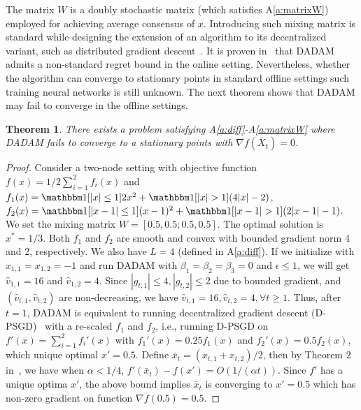 \documentclass[11pt]{article}
\newtheorem{theorem}{Theorem}
\begin{document}
The matrix $W$ is a doubly stochastic matrix (which satisfies A\ref{a:matrixW}) employed for achieving average consensus of $x$. 
Introducing such mixing matrix is standard while designing the extension of an algorithm to its decentralized variant, such as distributed gradient descent~\citep{nedic2009distributed, yuan2016convergence}. 
It is proven in~\cite{nazari2019dadam} that DADAM admits a non-standard regret bound in the online setting. Nevertheless, whether the algorithm can converge to stationary points in standard offline settings such training neural networks is still unknown.
The next theorem shows that DADAM may fail to converge in the offline  settings.



\begin{theorem}\label{thm: dadam_diverge}
There exists a problem satisfying A\ref{a:diff}-A\ref{a:matrixW} where DADAM fails to converge to a stationary points with $\nabla f(\bar X_t) = 0$.   
\end{theorem}



\begin{proof}
Consider a two-node setting with objective function $f(x) =1/2 \sum_{i=1}^2 f_i(x)$ and $f_1(x) =  \mathbbm 1[|x|\leq 1] 2x^2 +  \mathbbm 1[|x|> 1] (4|x|-2)$, $f_2(x) =  \mathbbm 1[|x-1|\leq 1](x-1)^2 + \mathbbm 1[|x-1| > 1] (2|x-1|-1)$. We set the mixing matrix  $W = [0.5,0.5;0.5,0.5]$. The optimal solution is $x^* = 1/3$.
Both $f_1$ and $f_2$ are smooth and convex with bounded gradient norm 4 and 2, respectively. 
We also have $L = 4$ (defined in A\ref{a:diff}). 
If we initialize with $x_{1,1} = x_{1,2} = -1$ and run DADAM with $\beta_1 = \beta_2 =\beta_3 = 0$ and $\epsilon \leq 1$, we will get $\hat v_{1,1} = 16$ and $\hat v_{1,2} = 4$. 
Since $|g_{t,1}| \leq 4, |g_{t,2}| \leq 2$ due to bounded gradient, and $(\hat v_{t,1},\hat v_{t,2})$ are non-decreasing, we have $\hat v_{t,1} = 16, \hat v_{t,2}=4, \forall t \geq 1$. 
Thus, after $t=1$, DADAM is equivalent to running decentralized gradient descent (D-PSGD)~\citep{yuan2016convergence} with a re-scaled $f_1$ and $f_2$, i.e.,  running D-PSGD on
$f'(x) = \sum_{i=1}^2 f_i'(x)$ with $f_1'(x) =  0.25 f_1(x)$ and $f_2'(x) = 0.5  f_2(x)$, which unique optimal $x'=0.5$. 
Define $\bar x_t = (x_{t,1}+x_{t,2})/2$, then by Theorem 2 in~\cite{yuan2016convergence}, we have when $\alpha < 1/4$, $f'(\bar x_t) - f(x') = O(1/(\alpha t))$. 
Since $f'$ has a unique optima $x'$, the above bound implies $\bar x_t$ is converging to $x'=0.5$ which has non-zero gradient on function $\nabla f(0.5) = 0.5$.
\end{proof}
\end{document}
